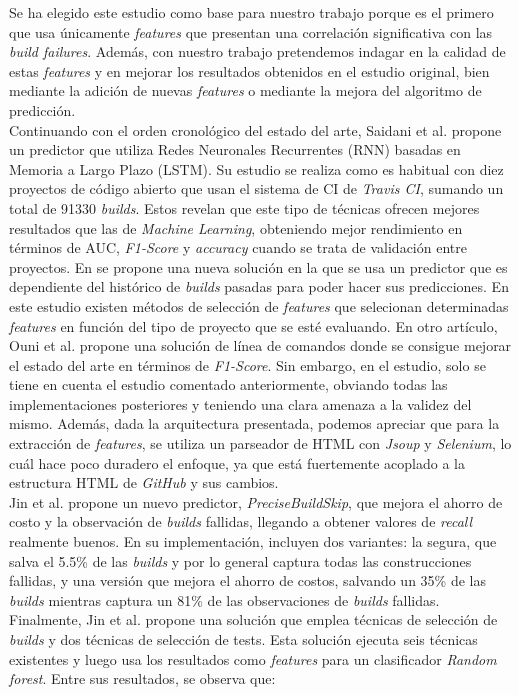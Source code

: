 Se ha elegido este estudio \cite{2} como base para nuestro trabajo porque es el primero que usa
únicamente \textit{features} que presentan una correlación significativa con las \textit{build
failures}. Además, con nuestro trabajo pretendemos indagar en la calidad de estas \textit{features}
y en mejorar los resultados obtenidos en el estudio original, bien mediante la adición de nuevas
\textit{features} o mediante la mejora del algoritmo de predicción.\\

Continuando con el orden cronológico del estado del arte, Saidani et al. \cite{15} propone un
predictor que utiliza Redes Neuronales Recurrentes (RNN) basadas en Memoria a Largo
Plazo (LSTM). Su estudio se realiza como es habitual con diez proyectos de código
abierto que usan el sistema de CI de \textit{Travis CI}, sumando un total de 91330
\textit{builds}. Estos revelan que este tipo de técnicas ofrecen mejores resultados
que las de \textit{Machine Learning}, obteniendo mejor rendimiento en términos de AUC,
\textit{F1-Score} y \textit{accuracy} cuando se trata de validación entre proyectos. En \cite{6}
se propone una nueva solución en la que se usa un predictor que es dependiente del histórico de
\textit{builds} pasadas para poder hacer sus predicciones. En este estudio existen métodos de
selección de \textit{features} que selecionan determinadas \textit{features} en función del tipo
de proyecto que se esté evaluando. En otro artículo, Ouni et al. \cite{14} propone una solución
de línea de comandos donde se consigue mejorar el estado del arte en términos de \textit{F1-Score}.
Sin embargo, en el estudio, solo se tiene en cuenta el estudio \cite{7} comentado anteriormente,
obviando todas las implementaciones posteriores y teniendo una clara amenaza a la validez del
mismo. Además, dada la arquitectura presentada, podemos apreciar que para la extracción de
\textit{features}, se utiliza un parseador de HTML con \textit{Jsoup} y \textit{Selenium},
lo cuál hace poco duradero el enfoque, ya que está fuertemente acoplado a la estructura
HTML de \textit{GitHub} y sus cambios. \\

Jin et al. \cite{4} propone un nuevo predictor, \textit{PreciseBuildSkip}, que mejora el ahorro
de costo y la observación de \textit{builds} fallidas, llegando a obtener valores de
\textit{recall} realmente buenos. En su implementación, incluyen dos variantes: la segura, que
salva el 5.5\% de las \textit{builds} y por lo general captura todas las construcciones fallidas,
y una versión que mejora el ahorro de costos, salvando un 35\% de las \textit{builds} mientras
captura un 81\% de las observaciones de \textit{builds} fallidas. Finalmente, Jin et al. \cite{1} propone
una solución que emplea técnicas de selección de \textit{builds} y dos técnicas de selección de
tests. Esta solución ejecuta seis técnicas existentes y luego usa los resultados como
\textit{features} para un clasificador \textit{Random forest}. Entre sus resultados, se observa
que:

